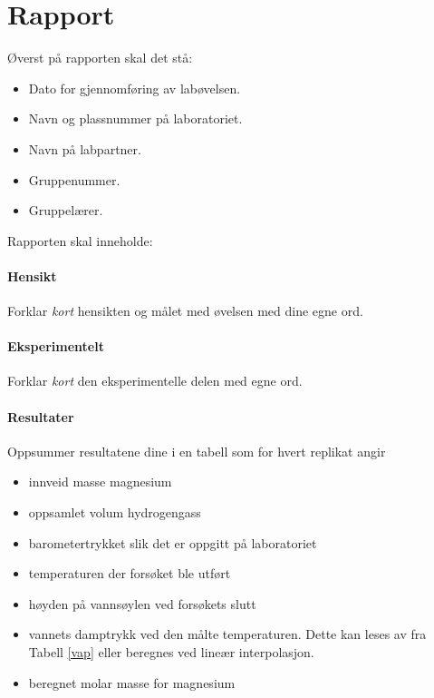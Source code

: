\documentclass[12pt, a4]{article}
\begin{document}
	\clearpage
	
	\section{Rapport}
	Øverst på rapporten skal det stå:
	
	\begin{itemize}
		
		\item Dato for gjennomføring av labøvelsen.
		
		\item Navn og plassnummer på laboratoriet.
		
		\item Navn på labpartner.
		
		\item Gruppenummer.
		
		\item Gruppelærer.
		
	\end{itemize}
	
	
	
	Rapporten skal inneholde:
	
	\paragraph{Hensikt}
	Forklar \emph{kort} hensikten og målet med øvelsen med dine egne ord.
	
	
	\paragraph{Eksperimentelt}
	Forklar \emph{kort} den eksperimentelle delen med egne ord.
	
	
	\paragraph{Resultater}
	Oppsummer resultatene dine i en tabell som for hvert replikat angir
	\begin{itemize}
		\item innveid masse magnesium
		\item oppsamlet volum hydrogengass
		\item barometertrykket slik det er oppgitt på laboratoriet
		\item temperaturen der forsøket ble utført
		\item høyden på vannsøylen ved forsøkets slutt
		\item vannets damptrykk ved den målte temperaturen. Dette kan leses av fra Tabell \ref{vap} eller beregnes ved lineær interpolasjon.
		\item beregnet molar masse for magnesium
	\end{itemize}
	
\end{document}
